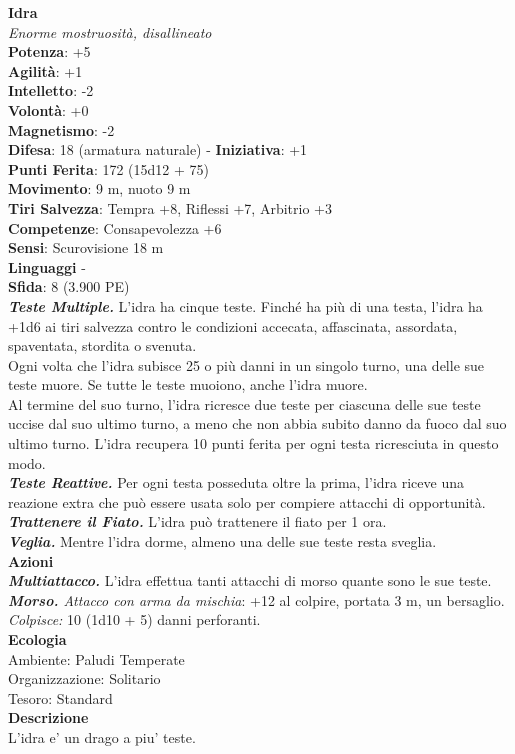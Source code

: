 \begin{multicols}{2}
\medskip\textbf{Idra}\\
\emph{Enorme mostruosità, disallineato}\\
\textbf{Potenza}: +5\\
\textbf{Agilità}: +1\\
\textbf{Intelletto}: -2\\
\textbf{Volontà}: +0\\
\textbf{Magnetismo}: -2\\
\textbf{Difesa}: 18 (armatura naturale) - \textbf{Iniziativa}: +1\\
\textbf{Punti Ferita}: 172 (15d12 + 75)\\
\textbf{Movimento}: 9 m, nuoto 9 m\\
\textbf{Tiri Salvezza}: Tempra +8, Riflessi +7, Arbitrio +3\\
\textbf{Competenze}: Consapevolezza +6\\
\textbf{Sensi}: Scurovisione 18 m\\
\textbf{Linguaggi} -\\
\textbf{Sfida}: 8 (3.900 PE)\smallskip\\
\emph{\textbf{Teste Multiple.}} L'idra ha cinque teste. Finché ha più di una testa, l'idra ha +1d6 ai tiri salvezza contro le condizioni accecata, affascinata, assordata, spaventata, stordita o svenuta.\\
Ogni volta che l'idra subisce 25 o più danni in un singolo turno, una delle sue teste muore. Se tutte le teste muoiono, anche l'idra muore.\\
Al termine del suo turno, l'idra ricresce due teste per ciascuna delle sue teste uccise dal suo ultimo turno, a meno che non abbia subito danno da fuoco dal suo ultimo turno. L'idra recupera 10 punti ferita per ogni testa ricresciuta in questo modo.\\
\emph{\textbf{Teste Reattive.}} Per ogni testa posseduta oltre la prima, l'idra riceve una reazione extra che può essere usata solo per compiere attacchi di opportunità.\\
\emph{\textbf{Trattenere il Fiato.}} L'idra può trattenere il fiato per 1 ora.\\
\emph{\textbf{Veglia.}} Mentre l'idra dorme, almeno una delle sue teste resta sveglia.\\
\smallskip\textbf{Azioni}\\
\emph{\textbf{Multiattacco.}} L'idra effettua tanti attacchi di morso quante sono le sue teste.\\
\emph{\textbf{Morso.} Attacco con arma da mischia}: +12 al colpire, portata 3 m, un bersaglio.\\
\emph{Colpisce:} 10 (1d10 + 5) danni perforanti. \\
\textbf{Ecologia}\\
Ambiente: Paludi Temperate\\
Organizzazione: Solitario\\
Tesoro: Standard\\
\textbf{Descrizione}\\
L'idra e' un drago a piu' teste.\\


\end{multicols}
